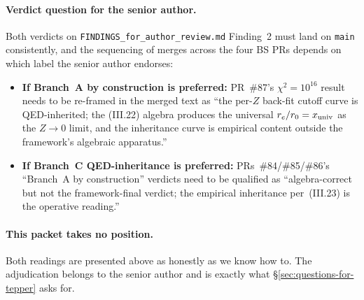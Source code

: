 \paragraph{Verdict question for the senior author.}
Both verdicts on \texttt{FINDINGS\_for\_author\_review.md} Finding~2 must
land on \texttt{main} consistently, and the sequencing of merges across the
four BS PRs depends on which label the senior author endorses:
\begin{itemize}[topsep=2pt,itemsep=0pt]
  \item \textbf{If Branch~A by construction is preferred:} PR~\#87's
        $\chi^2 = 10^{16}$ result needs to be re-framed in the merged text
        as ``the per-$Z$ back-fit cutoff curve is QED-inherited; the
        (III.22) algebra produces the universal $r_e/r_0 = x_{\rm univ}$ as
        the $Z\to 0$ limit, and the inheritance curve is empirical content
        outside the framework's algebraic apparatus.''
  \item \textbf{If Branch~C QED-inheritance is preferred:} PRs~\#84/\#85/\#86's
        ``Branch~A by construction'' verdicts need to be qualified as
        ``algebra-correct but not the framework-final verdict; the
        empirical inheritance per~(III.23) is the operative reading.''
\end{itemize}


\paragraph{This packet takes no position.}
Both readings are presented above as honestly as we know how to. The
adjudication belongs to the senior author and is exactly what
\S\ref{sec:questions-for-tepper} asks for.
